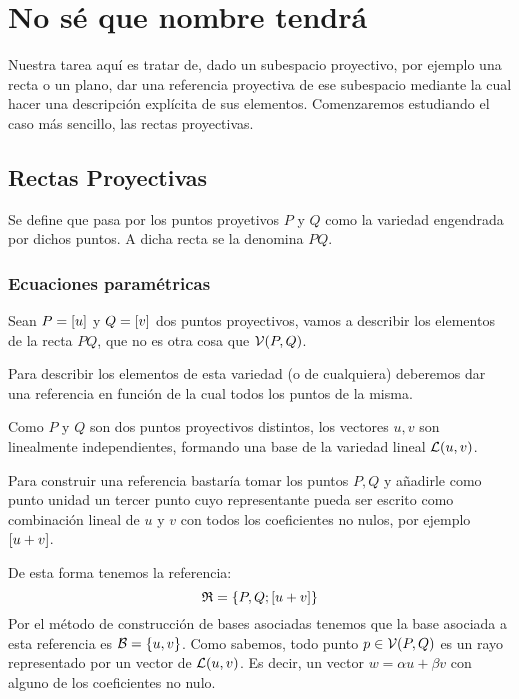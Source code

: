 \chapter{No sé que nombre tendrá}
\label{C3}

Nuestra tarea aquí es tratar de, dado un subespacio proyectivo, por ejemplo una recta o un plano, dar una referencia proyectiva de ese subespacio mediante la cual hacer una descripción explícita de sus elementos. Comenzaremos estudiando el caso más sencillo, las rectas proyectivas.

\section{Rectas Proyectivas}
\begin{defi}
	\label{C1_def_rectaProyectiva}
	Se define  que pasa por los puntos proyetivos $P$ y $Q$ como la variedad engendrada por dichos puntos. A dicha recta se la denomina  $PQ$.
\end{defi}
\subsection{Ecuaciones paramétricas}

Sean $P=\left [ u \right ]$ y $Q=\left [ v \right ]$ dos puntos proyectivos, vamos a describir los elementos de la recta $PQ$, que no es otra cosa que $\mathcal{V}(P,Q)$.
	
Para describir los elementos de esta variedad (o de cualquiera) deberemos dar una referencia en función de la cual  todos los puntos de la misma.
	
Como $P$ y $Q$ son dos puntos proyectivos distintos, los vectores $u,v$ son linealmente independientes, formando una base de la variedad lineal $\mathcal{L}(u,v)$.
	
Para construir una referencia bastaría tomar los puntos $P,Q$ y añadirle como punto unidad un tercer punto cuyo representante pueda ser escrito como combinación lineal de $u$ y $v$ con todos los coeficientes no nulos, por ejemplo $\left [ u+v \right ]$.
	
De esta forma tenemos la referencia:
\[\mathfrak{R}=\{P,Q;\left [ u+v \right ]\}\]
Por el método de construcción de bases asociadas tenemos que la base asociada a esta referencia es $\mathcal{B}=\{u,v\}$. Como sabemos, todo punto $p\in\mathcal{V}(P,Q)$ es un rayo representado por un vector de $\mathcal{L}(u,v)$. Es decir, un vector $w=\alpha u+\beta v$ con alguno de los coeficientes no nulo.
	
